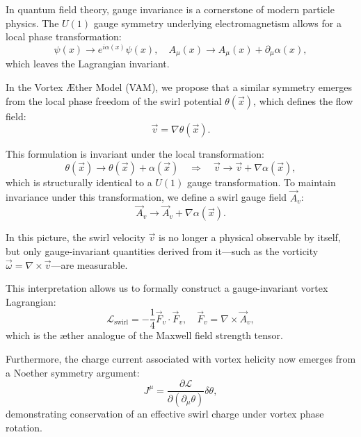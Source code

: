 In quantum field theory, gauge invariance is a cornerstone of modern particle physics. The $U(1)$ gauge symmetry underlying electromagnetism allows for a local phase transformation:
\begin{equation}
\psi(x) \rightarrow e^{i\alpha(x)} \psi(x), \quad A_\mu(x) \rightarrow A_\mu(x) + \partial_\mu \alpha(x),
\end{equation}
which leaves the Lagrangian invariant.

In the Vortex Æther Model (VAM), we propose that a similar symmetry emerges from the local phase freedom of the swirl potential $\theta(\vec{x})$, which defines the flow field:
\begin{equation}
\vec{v} = \nabla \theta(\vec{x}).
\end{equation}

This formulation is invariant under the local transformation:
\begin{equation}
\theta(\vec{x}) \rightarrow \theta(\vec{x}) + \alpha(\vec{x}) \quad \Rightarrow \quad \vec{v} \rightarrow \vec{v} + \nabla \alpha(\vec{x}),
\end{equation}
which is structurally identical to a $U(1)$ gauge transformation. To maintain invariance under this transformation, we define a swirl gauge field $\vec{A}_v$:
\begin{equation}
\vec{A}_v \rightarrow \vec{A}_v + \nabla \alpha(\vec{x}).
\end{equation}

In this picture, the swirl velocity $\vec{v}$ is no longer a physical observable by itself, but only gauge-invariant quantities derived from it—such as the vorticity $\vec{\omega} = \nabla \times \vec{v}$—are measurable.

This interpretation allows us to formally construct a gauge-invariant vortex Lagrangian:
\begin{equation}
\mathcal{L}_{\text{swirl}} = -\frac{1}{4} \vec{F}_v \cdot \vec{F}_v, \quad \vec{F}_v = \nabla \times \vec{A}_v,
\end{equation}
which is the æther analogue of the Maxwell field strength tensor.

Furthermore, the charge current associated with vortex helicity now emerges from a Noether symmetry argument:
\begin{equation}
J^\mu = \frac{\partial \mathcal{L}}{\partial (\partial_\mu \theta)} \delta \theta,
\end{equation}
demonstrating conservation of an effective swirl charge under vortex phase rotation.


